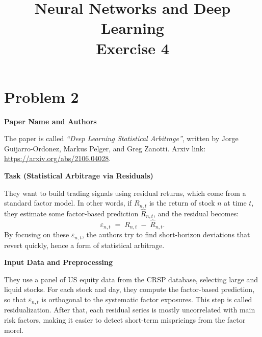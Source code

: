 \documentclass[11pt]{article}
\title{Neural Networks and Deep Learning\\
       Exercise 4}
\begin{document}
\maketitle

% 


\section*{Problem 2}

\textbf{Paper Name and Authors}

The paper is called \emph{``Deep Learning Statistical Arbitrage''}, written by 
Jorge Guijarro-Ordonez, Markus Pelger, and Greg Zanotti. Arxiv link: \url{https://arxiv.org/abs/2106.04028}. 

\vspace{1em}
\textbf{Task (Statistical Arbitrage via Residuals)}

They want to build trading signals using residual returns, which come from a 
standard factor model. In other words, if $R_{n,t}$ is the return of stock $n$ 
at time $t$, they estimate some factor-based prediction $\hat{R}_{n,t}$, and 
the residual becomes:
\[
\varepsilon_{n,t} \;=\; R_{n,t} \;-\; \hat{R}_{n,t}.
\]
By focusing on these $\varepsilon_{n,t}$, the authors try to find short-horizon 
deviations that revert quickly, hence a form of statistical arbitrage.

\vspace{1em}
\textbf{Input Data and Preprocessing}

They use a panel of US equity data from the CRSP database, selecting 
large and liquid stocks. For each stock and day, they compute the factor-based 
prediction, so that $\varepsilon_{n,t}$ is orthogonal to the systematic factor 
exposures. This step is called residualization. After that, each 
residual series is mostly uncorrelated with main risk factors, making it easier 
to detect short-term mispricings from the factor morel.
\end{document}

